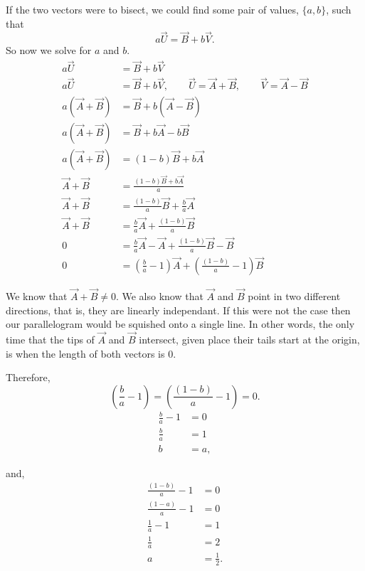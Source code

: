 If the two vectors were to bisect, we could find some pair of values, 
$\{a,b\}$, such that \[ a\vec{U} = \vec{B} + b\vec{V}. \]
So now we solve for $a$ and $b$.
\begin{align*}
a\vec{U} &= \vec{B} + b\vec{V}\\
a\vec{U} &=  \vec{B} + b\vec{V}, 
\hspace{2em}\vec{U} = \vec{A}+\vec{B},
\hspace{2em}\vec{V} = \vec{A}-\vec{B}\\
a(\vec{A} + \vec{B}) &= \vec{B} + b(\vec{A}-\vec{B})\\
a(\vec{A} + \vec{B}) &= \vec{B} + b\vec{A}-b\vec{B}\\
a(\vec{A} + \vec{B}) &= (1-b)\vec{B} + b\vec{A}\\
\vec{A} + \vec{B} &= \frac{(1-b)\vec{B} + b\vec{A}}{a}\\
\vec{A} + \vec{B} &= \frac{(1-b)}{a}\vec{B} + \frac{b}{a}\vec{A}\\
\vec{A} + \vec{B} &= \frac{b}{a}\vec{A} + \frac{(1-b)}{a}\vec{B} \\
0 &= \frac{b}{a}\vec{A} -\vec{A} + \frac{(1-b)}{a}\vec{B}  -\vec{B}\\
0 &= (\frac{b}{a} - 1)\vec{A} + (\frac{(1-b)}{a} - 1)\vec{B}
\end{align*}

We know that $\vec{A} + \vec{B} \neq 0$. We also know that $\vec{A}$ and $\vec{B}$
point in two different directions, that is, they are linearly independant. If this
were not the case then our parallelogram would be squished onto a single line.
In other words, the only time that the tips of $\vec{A}$ and $\vec{B}$ intersect, 
given place their tails start at the origin, is when the length of both vectors is $0$.

Therefore,
\[(\frac{b}{a} - 1) = (\frac{(1-b)}{a} - 1) = 0.\]
\begin{align*}
\frac{b}{a} - 1 &= 0\\
\frac{b}{a} &= 1\\
b &= a,
\end{align*}

and,
\begin{align*}
\frac{(1-b)}{a} - 1 &= 0\\
\frac{(1-a)}{a} - 1 &= 0\\
\frac{1}{a} - 1 &= 1\\
\frac{1}{a} &= 2\\
a &= \frac{1}{2}.
\end{align*}

